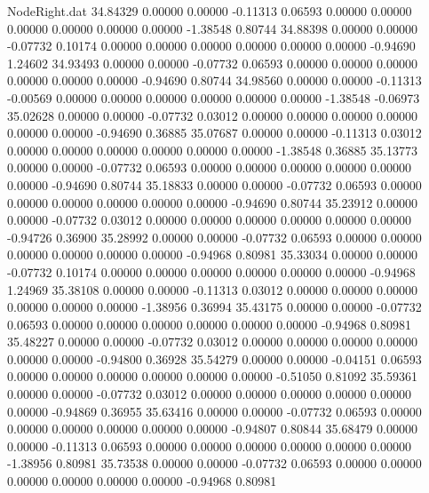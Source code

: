 \begin{filecontents}{NodeRight.dat}
  34.84329    0.00000    0.00000    -0.11313    0.06593    0.00000    0.00000    0.00000    0.00000    0.00000    0.00000   -1.38548    0.80744
  34.88398    0.00000    0.00000    -0.07732    0.10174    0.00000    0.00000    0.00000    0.00000    0.00000    0.00000   -0.94690    1.24602
  34.93493    0.00000    0.00000    -0.07732    0.06593    0.00000    0.00000    0.00000    0.00000    0.00000    0.00000   -0.94690    0.80744
  34.98560    0.00000    0.00000    -0.11313   -0.00569    0.00000    0.00000    0.00000    0.00000    0.00000    0.00000   -1.38548   -0.06973
  35.02628    0.00000    0.00000    -0.07732    0.03012    0.00000    0.00000    0.00000    0.00000    0.00000    0.00000   -0.94690    0.36885
  35.07687    0.00000    0.00000    -0.11313    0.03012    0.00000    0.00000    0.00000    0.00000    0.00000    0.00000   -1.38548    0.36885
  35.13773    0.00000    0.00000    -0.07732    0.06593    0.00000    0.00000    0.00000    0.00000    0.00000    0.00000   -0.94690    0.80744
  35.18833    0.00000    0.00000    -0.07732    0.06593    0.00000    0.00000    0.00000    0.00000    0.00000    0.00000   -0.94690    0.80744
  35.23912    0.00000    0.00000    -0.07732    0.03012    0.00000    0.00000    0.00000    0.00000    0.00000    0.00000   -0.94726    0.36900
  35.28992    0.00000    0.00000    -0.07732    0.06593    0.00000    0.00000    0.00000    0.00000    0.00000    0.00000   -0.94968    0.80981
  35.33034    0.00000    0.00000    -0.07732    0.10174    0.00000    0.00000    0.00000    0.00000    0.00000    0.00000   -0.94968    1.24969
  35.38108    0.00000    0.00000    -0.11313    0.03012    0.00000    0.00000    0.00000    0.00000    0.00000    0.00000   -1.38956    0.36994
  35.43175    0.00000    0.00000    -0.07732    0.06593    0.00000    0.00000    0.00000    0.00000    0.00000    0.00000   -0.94968    0.80981
  35.48227    0.00000    0.00000    -0.07732    0.03012    0.00000    0.00000    0.00000    0.00000    0.00000    0.00000   -0.94800    0.36928
  35.54279    0.00000    0.00000    -0.04151    0.06593    0.00000    0.00000    0.00000    0.00000    0.00000    0.00000   -0.51050    0.81092
  35.59361    0.00000    0.00000    -0.07732    0.03012    0.00000    0.00000    0.00000    0.00000    0.00000    0.00000   -0.94869    0.36955
  35.63416    0.00000    0.00000    -0.07732    0.06593    0.00000    0.00000    0.00000    0.00000    0.00000    0.00000   -0.94807    0.80844
  35.68479    0.00000    0.00000    -0.11313    0.06593    0.00000    0.00000    0.00000    0.00000    0.00000    0.00000   -1.38956    0.80981
  35.73538    0.00000    0.00000    -0.07732    0.06593    0.00000    0.00000    0.00000    0.00000    0.00000    0.00000   -0.94968    0.80981

\end{filecontents}
